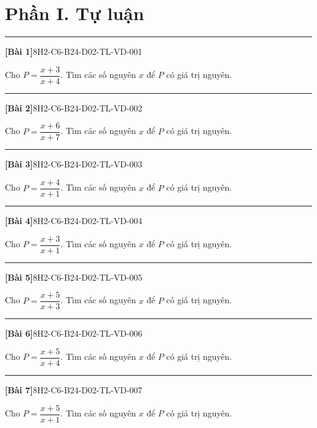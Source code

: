 \documentclass[12pt,a4paper]{article}
\newif\ifloigiai
\newenvironment{cauhoi}[2]{%
  \par\medskip\noindent\rule{\textwidth}{0.4pt}\par\nopagebreak
  \noindent\textbf{[#1]}\hfill{\scriptsize\ttfamily #2}\par\nopagebreak\smallskip}{\par}
\newcommand{\loigiai}[1]{\ifloigiai\par\smallskip\noindent\textit{Lời giải.} #1\par\fi}
\begin{document}
\section*{Phần I. Tự luận}
\begin{cauhoi}{Bài 1}{8H2-C6-B24-D02-TL-VD-001}
Cho $P=\dfrac{x+3}{x+4}$. Tìm các số nguyên $x$ để $P$ có giá trị nguyên.
\loigiai{Viết $P=\dfrac{(x+4)-1}{x+4}=1+\dfrac{-1}{x+4}$. $P$ nguyên khi $x+4$ là ước của $-1$, tức $x+4\in\{-1; 1\}$. Suy ra $x\in\{-5; -3\}$.}
\end{cauhoi}
\begin{cauhoi}{Bài 2}{8H2-C6-B24-D02-TL-VD-002}
Cho $P=\dfrac{x+6}{x+7}$. Tìm các số nguyên $x$ để $P$ có giá trị nguyên.
\loigiai{Viết $P=\dfrac{(x+7)-1}{x+7}=1+\dfrac{-1}{x+7}$. $P$ nguyên khi $x+7$ là ước của $-1$, tức $x+7\in\{-1; 1\}$. Suy ra $x\in\{-8; -6\}$.}
\end{cauhoi}
\begin{cauhoi}{Bài 3}{8H2-C6-B24-D02-TL-VD-003}
Cho $P=\dfrac{x+4}{x+1}$. Tìm các số nguyên $x$ để $P$ có giá trị nguyên.
\loigiai{Viết $P=\dfrac{(x+1)+3}{x+1}=1+\dfrac{3}{x+1}$. $P$ nguyên khi $x+1$ là ước của $3$, tức $x+1\in\{-3; -1; 1; 3\}$. Suy ra $x\in\{-4; -2; 0; 2\}$.}
\end{cauhoi}
\begin{cauhoi}{Bài 4}{8H2-C6-B24-D02-TL-VD-004}
Cho $P=\dfrac{x+3}{x+1}$. Tìm các số nguyên $x$ để $P$ có giá trị nguyên.
\loigiai{Viết $P=\dfrac{(x+1)+2}{x+1}=1+\dfrac{2}{x+1}$. $P$ nguyên khi $x+1$ là ước của $2$, tức $x+1\in\{-2; -1; 1; 2\}$. Suy ra $x\in\{-3; -2; 0; 1\}$.}
\end{cauhoi}
\begin{cauhoi}{Bài 5}{8H2-C6-B24-D02-TL-VD-005}
Cho $P=\dfrac{x+5}{x+3}$. Tìm các số nguyên $x$ để $P$ có giá trị nguyên.
\loigiai{Viết $P=\dfrac{(x+3)+2}{x+3}=1+\dfrac{2}{x+3}$. $P$ nguyên khi $x+3$ là ước của $2$, tức $x+3\in\{-2; -1; 1; 2\}$. Suy ra $x\in\{-5; -4; -2; -1\}$.}
\end{cauhoi}
\begin{cauhoi}{Bài 6}{8H2-C6-B24-D02-TL-VD-006}
Cho $P=\dfrac{x+5}{x+4}$. Tìm các số nguyên $x$ để $P$ có giá trị nguyên.
\loigiai{Viết $P=\dfrac{(x+4)+1}{x+4}=1+\dfrac{1}{x+4}$. $P$ nguyên khi $x+4$ là ước của $1$, tức $x+4\in\{-1; 1\}$. Suy ra $x\in\{-5; -3\}$.}
\end{cauhoi}
\begin{cauhoi}{Bài 7}{8H2-C6-B24-D02-TL-VD-007}
Cho $P=\dfrac{x+5}{x+1}$. Tìm các số nguyên $x$ để $P$ có giá trị nguyên.
\loigiai{Viết $P=\dfrac{(x+1)+4}{x+1}=1+\dfrac{4}{x+1}$. $P$ nguyên khi $x+1$ là ước của $4$, tức $x+1\in\{-4; -2; -1; 1; 2; 4\}$. Suy ra $x\in\{-5; -3; -2; 0; 1; 3\}$.}
\end{cauhoi}
\end{document}
